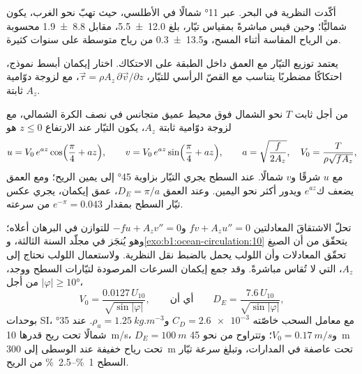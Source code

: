 أكّدت النظرية في البحر. عبر \ang{11} شمالًا في الأطلسي، حيث تهبّ  نحو الغرب، يكون  شماليًّا؛ وحين قيس مباشرةً بمقياس تيّار، بلغ \qty[uncertainty-mode=separate]{12.0 \pm 5.5}{\sverdrup}، مقابل \qty[uncertainty-mode=separate]{8.8 \pm 1.9}{\sverdrup} محسوبة من الرياح المقاسة أثناء المسح، و\qty[uncertainty-mode=separate]{13.5 \pm 0.3}{\sverdrup} من رياح متوسطة على سنوات كثيرة.

يعتمد توزيع التيّار مع العمق داخل الطبقة على الاحتكاك. اختار إيكمان أبسط نموذج، احتكاكًا مضطربًا يتناسب مع القصّ الرأسي للتيّار، $\vec\tau = \rho A_z\,\partial\vec v/\partial z$، مع لزوجة دوّامية ثابتة $A_z$.

\begin{proposition}\label{prop:b1:ocean-circulation:spiral}
من أجل  ثابت $T$ نحو الشمال فوق محيط عميق متجانس في نصف الكرة الشمالي، مع لزوجة دوّامية ثابتة $A_z$، يكون التيّار عند الارتفاع $z
\leq 0$ هو
\[
  u = V_0\,e^{az}\cos\Bigl(\frac\pi4 + az\Bigr),\qquad
  v = V_0\,e^{az}\sin\Bigl(\frac\pi4 + az\Bigr),\qquad
  a = \sqrt{\frac{f}{2A_z}},\quad V_0 = \frac{T}{\rho\sqrt{fA_z}},
\]
مع $u$ شرقًا و$v$ شمالًا. عند السطح يجري التيّار بزاوية \ang{45} إلى يمين الريح؛ ومع العمق يضعف ك$e^{az}$ ويدور أكثر نحو اليمين. وعند العمق $D_E = \pi/a$، عمق إيكمان، يجري عكس تيّار السطح بمقدار $e^{-\pi} = \num{0.043}$ من سرعته.
\end{proposition}
\admitted

تحلّ الاشتقاقَ المعادلتين $f v + A_z u'' = 0$ و$-f u + A_z v'' =
0$ للتوازن في البرهان أعلاه؛ وهو يُنجَز في مجلّد السنة الثالثة، و\cref{exo:b1:ocean-circulation:10} يتحقّق من أن الصيغ تحقّق المعادلات وأن اللولب يحمل بالضبط نقل النظرية. ولاستعمال اللولب نحتاج إلى $A_z$، التي لا تُقاس مباشرةً. وقد جمع إيكمان السرعات المرصودة لتيّارات السطح ووجد، من أجل $|\varphi| \geq \ang{10}$،
\[
  V_0 = \frac{0.0127\,U_{10}}{\sqrt{\sin|\varphi|}},
  \qquad\text{أي أن}\qquad
  D_E = \frac{7.6\,U_{10}}{\sqrt{\sin|\varphi|}},
\]
بوحدات SI، مع معامل السحب خاصّته $C_D = \num{2.6e-3}$ و$\rho_a =
\qty{1.25}{kg.m^{-3}}$. عند \ang{35} شمالًا تحت ريح قدرها \qty{10}{m/s}، $D_E =
\qty{100}{m}$ و$V_0 = \qty{0.17}{m/s}$؛ وتتراوح  من نحو \qty{45}{m} تحت رياح خفيفة عند  الوسطى إلى \qty{300}{m} تحت عاصفة في المدارات، وتبلغ سرعة تيّار السطح \qtyrange{1}{2.5}{\percent} من الريح.

